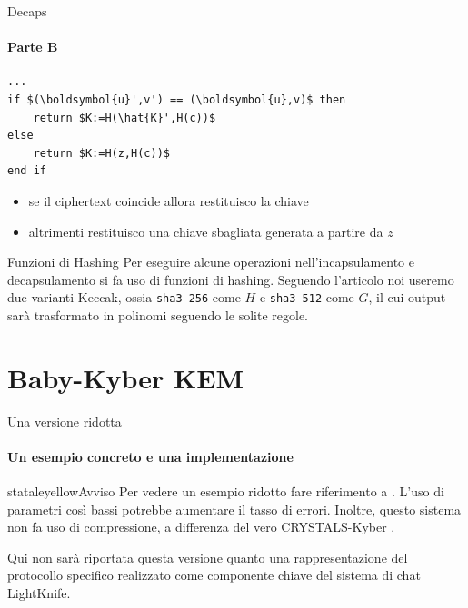 \begin{frame}[fragile]{Decaps}
            \framesubtitle{Parte B}
\begin{minipage}{0.45\linewidth}
    \begin{lstlisting}[title=Kyber.Decaps(sk\,z\,c):,mathescape=true,firstnumber=3]
...
if $(\boldsymbol{u}',v') == (\boldsymbol{u},v)$ then
    return $K:=H(\hat{K}',H(c))$
else
    return $K:=H(z,H(c))$
end if
    \end{lstlisting}
    \end{minipage}\hfill
    \begin{minipage}{0.5\linewidth}
        \begin{itemize}%
            \item se il ciphertext coincide allora restituisco la chiave
            \item altrimenti restituisco una chiave sbagliata generata a partire da $z$
        \end{itemize}
    \end{minipage}
        \end{frame}



\begin{frame}{Funzioni di Hashing}
    Per eseguire alcune operazioni nell'incapsulamento e decapsulamento si fa uso di funzioni di hashing. Seguendo l'articolo \cite{kyber17} noi useremo due varianti Keccak, ossia \texttt{sha3-256} come $H$ e \texttt{sha3-512} come $G$, il cui output sarà trasformato in polinomi seguendo le solite regole.
\end{frame}

\section{Baby-Kyber KEM}

\begin{frame}{Una versione ridotta}
    \framesubtitle{Un esempio concreto e una implementazione}
    \begin{colorblock}{stataleyellow}{Avviso}
        Per vedere un esempio ridotto fare riferimento a \cite{babykyber}. L'uso di parametri così bassi potrebbe aumentare il tasso di errori. Inoltre, questo sistema non fa uso di compressione, a differenza del vero CRYSTALS-Kyber \cite{kyber17,ufficiale}.
    \end{colorblock}

    Qui non sarà riportata questa versione quanto una rappresentazione del protocollo specifico realizzato come componente chiave del sistema di chat LightKnife.

\end{frame}

